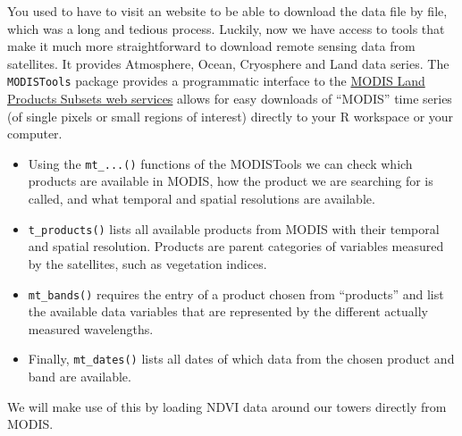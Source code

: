 \documentclass[
]{book}
\newenvironment{Shaded}{\begin{snugshade}}{\end{snugshade}}
\newcommand{\DataTypeTok}[1]{\textcolor[rgb]{0.13,0.29,0.53}{#1}}
\newcommand{\KeywordTok}[1]{\textcolor[rgb]{0.13,0.29,0.53}{\textbf{#1}}}
\newcommand{\NormalTok}[1]{#1}
\newcommand{\OperatorTok}[1]{\textcolor[rgb]{0.81,0.36,0.00}{\textbf{#1}}}
\newcommand{\StringTok}[1]{\textcolor[rgb]{0.31,0.60,0.02}{#1}}
\providecommand{\tightlist}{%
  \setlength{\itemsep}{0pt}\setlength{\parskip}{0pt}}
\begin{document}
You used to have to visit an website to be able to download the data file by file, which was a long and tedious process. Luckily, now we have access to tools that make it much more straightforward to download remote sensing data from satellites. It provides Atmosphere, Ocean, Cryosphere and Land data series. The \texttt{MODISTools} package provides a programmatic interface to the \href{https://modis.gsfc.nasa.gov/}{MODIS Land Products Subsets web services} allows for easy downloads of ``MODIS'' time series (of single pixels or small regions of interest) directly to your R workspace or your computer.

\begin{itemize}
\tightlist
\item
  Using the \texttt{mt\_...()} functions of the MODISTools we can check which products are available in MODIS, how the product we are searching for is called, and what temporal and spatial resolutions are available.
\item
  \texttt{t\_products()} lists all available products from MODIS with their temporal and spatial resolution. Products are parent categories of variables measured by the satellites, such as vegetation indices.
\item
  \texttt{mt\_bands()} requires the entry of a product chosen from ``products'' and list the available data variables that are represented by the different actually measured wavelengths.
\item
  Finally, \texttt{mt\_dates()} lists all dates of which data from the chosen product and band are available.
\end{itemize}

We will make use of this by loading NDVI data around our towers directly from MODIS.

\begin{Shaded}
\end{Shaded}
\end{document}
